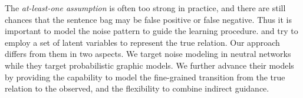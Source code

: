 The \emph{at-least-one assumption} is often too strong in practice, and there are still chances that the
sentence bag may be false positive or false negative. Thus it is important to model the noise pattern 
to guide the learning procedure.
\cite{ritter2013modeling} and \cite{min2013distant} try to 
employ a set of latent variables to represent the true relation. Our approach differs
from them in two aspects. 
We target  noise modeling in neutral networks while they target probabilistic graphic models. 
We further advance their models by providing the capability to model the fine-grained transition from the true relation to the observed, and 
the flexibility to combine indirect guidance.





